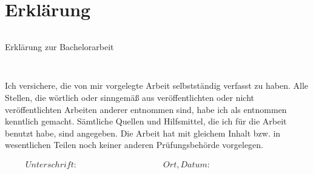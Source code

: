 \section*{Erklärung}

\begin{verbatim}

\end{verbatim}

\noindent
\begin{LARGE}Erklärung zur Bachelorarbeit\end{LARGE}
\begin{verbatim}


\end{verbatim}
Ich versichere, die von mir vorgelegte Arbeit selbstständig verfasst zu haben. Alle Stellen, die wörtlich oder sinngemäß aus veröffentlichten oder nicht veröffentlichten Arbeiten anderer entnommen sind, habe ich als entnommen kenntlich gemacht. Sämtliche Quellen und Hilfsmittel, die ich für die Arbeit benutzt habe, sind angegeben. Die Arbeit hat mit gleichem Inhalt bzw. in wesentlichen Teilen noch keiner anderen Prüfungsbehörde vorgelegen.



\begin{displaymath}
\begin{array}{ll}
Unterschrift:~~~~~~~~~~~~~~~~~~~~~~~~~~~~~~~~~~~~~~~~~~
& Ort, Datum:~~~~~~~~~~~~~~~~~~~~~~~~~~~~~~~~~~~~~~~~~~
\end{array}
\end{displaymath}
